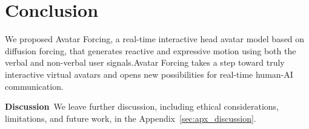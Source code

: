 \section{Conclusion} \label{sec:conclusion}
We proposed Avatar Forcing, a real-time interactive head avatar model based on diffusion forcing, that generates reactive and expressive motion using both the verbal and non-verbal user signals.Avatar Forcing takes a step toward truly interactive virtual avatars and opens new possibilities for real-time human-AI communication.

\noindent \textbf{Discussion}~We leave further discussion, including ethical considerations, limitations, and future work, in the Appendix~\ref{sec:apx_discussion}.

